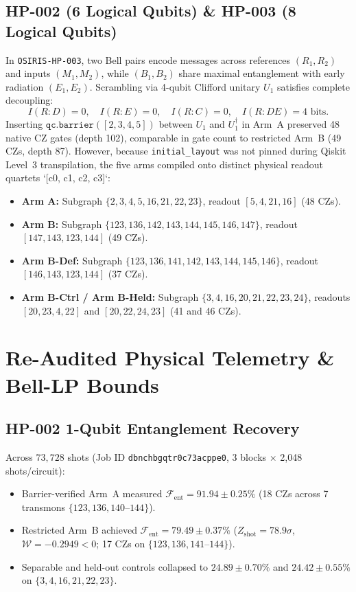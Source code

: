 \documentclass[aps,prxquantum,reprint,superscriptaddress,floatfix]{revtex4-2}
\begin{document}
\subsection{HP-002 (6 Logical Qubits) \& HP-003 (8 Logical Qubits)}
In \texttt{OSIRIS-HP-003}, two Bell pairs encode messages across references $(R_1, R_2)$ and inputs $(M_1, M_2)$, while $(B_1, B_2)$ share maximal entanglement with early radiation $(E_1, E_2)$. Scrambling via 4-qubit Clifford unitary $U_1$ satisfies complete decoupling:
\begin{equation}
    I(R:D) = 0, \quad I(R:E) = 0, \quad I(R:C) = 0, \quad I(R:DE) = 4\text{ bits}.
\end{equation}
Inserting $\texttt{qc.barrier}([2, 3, 4, 5])$ between $U_1$ and $U_1^\dagger$ in Arm~A preserved 48 native CZ gates (depth 102), comparable in gate count to restricted Arm~B (49 CZs, depth 87). However, because \texttt{initial\_layout} was not pinned during Qiskit Level~3 transpilation, the five arms compiled onto distinct physical readout quartets `[c0, c1, c2, c3]`:
\begin{itemize}
    \item \textbf{Arm A:} Subgraph $\{2, 3, 4, 5, 16, 21, 22, 23\}$, readout $[5, 4, 21, 16]$ (48 CZs).
    \item \textbf{Arm B:} Subgraph $\{123, 136, 142, 143, 144, 145, 146, 147\}$, readout $[147, 143, 123, 144]$ (49 CZs).
    \item \textbf{Arm B-Def:} Subgraph $\{123, 136, 141, 142, 143, 144, 145, 146\}$, readout $[146, 143, 123, 144]$ (37 CZs).
    \item \textbf{Arm B-Ctrl / Arm B-Held:} Subgraph $\{3, 4, 16, 20, 21, 22, 23, 24\}$, readouts $[20, 23, 4, 22]$ and $[20, 22, 24, 23]$ (41 and 46 CZs).
\end{itemize}

\section{Re-Audited Physical Telemetry \& Bell-LP Bounds}

\subsection{HP-002 1-Qubit Entanglement Recovery}
Across $73{,}728$ shots (Job ID \texttt{dbnchbgqtr0c73acppe0}, 3 blocks $\times$ 2,048 shots/circuit):
\begin{itemize}
    \item Barrier-verified Arm~A measured $\mathcal{F}_{\mathrm{ent}} = \mathbf{91.94 \pm 0.25\%}$ (18 CZs across 7 transmons $\{123, 136, 140\text{--}144\}$).
    \item Restricted Arm~B achieved $\mathcal{F}_{\mathrm{ent}} = \mathbf{79.49 \pm 0.37\%}$ ($Z_{\mathrm{shot}} = 78.9\sigma$, $\mathcal{W} = -0.2949 < 0$; 17 CZs on $\{123, 136, 141\text{--}144\}$).
    \item Separable and held-out controls collapsed to $24.89 \pm 0.70\%$ and $24.42 \pm 0.55\%$ on $\{3, 4, 16, 21, 22, 23\}$.
\end{itemize}
\end{document}
